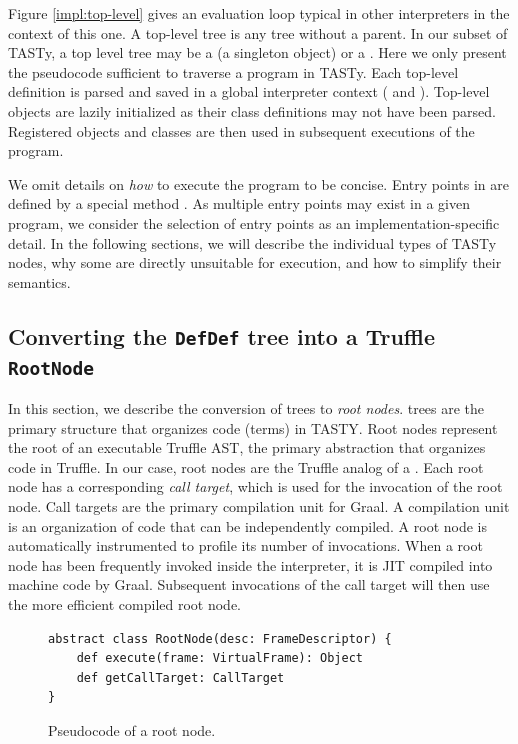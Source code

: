 Figure \ref{impl:top-level} gives an evaluation loop typical in other interpreters in the context of this one.
A top-level tree is any tree without a parent.
In our subset of TASTy, a top level tree may be a  (a singleton object) or a .
Here we only present the pseudocode sufficient to traverse a program in TASTy. 
Each top-level definition is parsed and saved in a global interpreter context ( and ).
Top-level objects are lazily initialized as their class definitions may not have been parsed.
Registered objects and classes are then used in subsequent executions of the program.

We omit details on \textit{how} to execute the program to be concise.
Entry points in  are defined by a special method .
As multiple entry points may exist in a given program, we consider the selection of entry points as an implementation-specific detail.
In the following sections, we will describe the individual types of TASTy nodes, why some are directly unsuitable for execution, and how to simplify their semantics.

\subsection{Converting the \texttt{DefDef} tree into a Truffle \texttt{RootNode}}
\label{impl:subsection:defdef}

In this section, we describe the conversion of  trees to \textit{root nodes}.
 trees are the primary structure that organizes code (terms) in TASTY.
Root nodes represent the root of an executable Truffle AST, the primary abstraction that organizes code in Truffle.
In our case, root nodes are the Truffle analog of a .
Each root node has a corresponding \textit{call target}, which is used for the invocation of the root node.
Call targets are the primary compilation unit for Graal.
A compilation unit is an organization of code that can be independently compiled.
A root node is automatically instrumented\cite{profiling:atom} to profile its number of invocations. 
When a root node has been frequently invoked inside the interpreter, it is JIT compiled into machine code by Graal.
Subsequent invocations of the call target will then use the more efficient compiled root node.

\begin{figure}[!htb]
\begin{verbatim}
abstract class RootNode(desc: FrameDescriptor) {
	def execute(frame: VirtualFrame): Object
	def getCallTarget: CallTarget
}
\end{verbatim}
\caption{Pseudocode of a root node.}
\label{example:root-node}
\end{figure}

